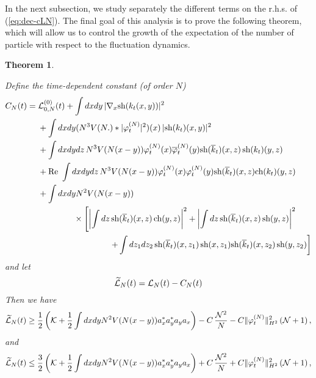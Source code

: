 \documentclass[11pt,a4paper,DIV11]{scrartcl}	%
\newtheorem{theorem}{Theorem}[section]
\newcommand{\wt}{\widetilde}
\newcommand{\cK}{{\cal K}}
\newcommand{\cL}{{\cal L}}
\newcommand{\cN}{{\cal N}}
\begin{document}
In the next subsection, we study separately the different terms on the r.h.s. of (\ref{eq:dec-cLN}). The final goal of this analysis is to prove the following theorem, which will allow us to control the growth of the expectation of the number of particle with respect to the fluctuation dynamics.
\begin{theorem}\label{thm:L}

Define the time-dependent constant (of order $N$)
\begin{equation}\label{eq:CNt} \begin{split} 
C_N (t) = \; &\cL^{(0)}_{0,N} (t) + \int dx dy \, |\nabla_x \text{sh} (k_t (x,y))|^2  \\ &+  \int dx dy (N^3 V(N.) * |\varphi_t^{(N)}|^2) (x) \, |\text{sh} (k_t) (x,y)|^2 \\ &+ \int dx dy dz \, N^3 V(N (x-y)) \varphi_t^{(N)} (x) \overline{\varphi}_t^{(N)} (y) \text{sh} (\overline{k}_t) (x,z)  \, \text{sh} (k_t) (y,z)  \\ &+ \text{Re } \int dx dy dz \, N^3 V(N (x-y)) \varphi_t^{(N)} (x) \varphi_t^{(N)} (y) \text{sh} (\overline{k}_t) (x,z) \text{ch} (k_t) (y,z)  \\
&+ \int dx dy N^2 V(N (x-y)) \\ &\hspace{1.5cm}  \times \left[ \left|\int dz \, \text{sh} (\overline{k}_t) (x,z) \, \text{ch} (y,z) \right|^2  + \left| \int dz \, \text{sh} (\overline{k}_t) (x,z) \, \text{sh} (y,z) \right|^2 \right. \\ &\hspace{3cm}  \left. 
+  \int dz_1 dz_2 \, \text{sh} (\overline{k}_t) (x,z_1) \, \text{sh} (x,z_1)  \text{sh} (\overline{k}_t) (x,z_2) \, \text{sh} (y,z_2) \right] 
\end{split} \end{equation}
and let
\begin{equation}\label{eq:wtcL} \wt{\cL}_N (t) = \cL_N (t) - C_N (t) \end{equation}
Then we have
\begin{equation}\label{eq:thmL-1} \wt{\cL}_N (t) \geq \frac{1}{2} \left( \cK + \frac{1}{2} \int dx dy N^2 V(N (x-y)) a_x^* a_y^* a_y a_x \right) - C \, \frac{\cN^2}{N}  - C \| \varphi_t^{(N)} \|_{H^2}^2  \left(\cN + 1\right), \end{equation}
and
\begin{equation}\label{eq:thmL-1b} \wt{\cL}_N (t) \leq \frac{3}{2} \left( \cK + \frac{1}{2} \int dx dy N^2 V(N (x-y)) a_x^* a_y^* a_y a_x \right) + C \, \frac{\cN^2}{N}  +  C \| \varphi_t^{(N)} \|_{H^2}^2  \left(\cN + 1\right), \end{equation}

\end{theorem}
\end{document}
